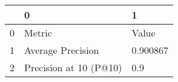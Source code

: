 \begin{tabular}{lll}
\toprule
{} &                       0 &         1 \\
\midrule
0 &                  Metric &     Value \\
1 &       Average Precision &  0.900867 \\
2 &  Precision at 10 (P@10) &       0.9 \\
\bottomrule
\end{tabular}
